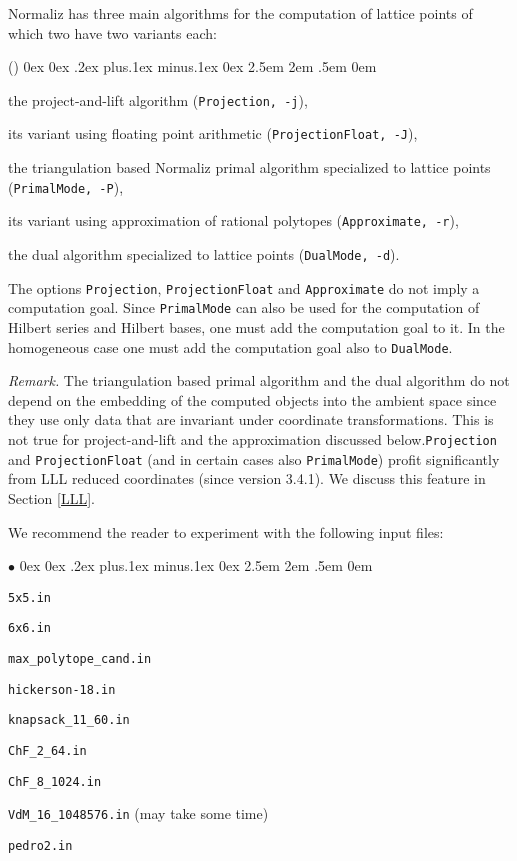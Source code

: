 \documentclass[12pt,a4paper]{scrartcl}
\newcounter{listi}
\newcommand{\stdli}{ \topsep0ex \partopsep0ex %
\parsep.2ex plus.1ex minus.1ex \itemsep0ex%
\leftmargin2.5em \labelwidth2em \labelsep.5em \rightmargin0em}%
\newenvironment{arab}{\begin{list}{\textup{(\arabic{listi})}}%
	{\usecounter{listi}\stdli}}{\end{list}}
\renewenvironment{itemize}{\begin{list}{{$\bullet$}}{\stdli}}{\end{list}}
\theoremstyle{definition}
\begin{document}
Normaliz has three main algorithms for the computation of lattice points of which two have two variants each:
\begin{arab}
\item the project-and-lift algorithm (\verb|Projection, -j|),
\item its variant using floating point arithmetic (\verb|ProjectionFloat, -J|),
\item the triangulation based Normaliz primal algorithm specialized to lattice points\\ (\verb|PrimalMode, -P|),
\item its variant using approximation of rational polytopes (\verb|Approximate, -r|),
\item the dual algorithm  specialized to lattice points (\verb|DualMode, -d|).
\end{arab}

The options \verb|Projection|, \verb|ProjectionFloat| and \verb|Approximate| do not imply a computation goal. Since \verb|PrimalMode| can also be used for the computation of Hilbert series and Hilbert bases, one must add the computation goal to it. In the homogeneous case one must add the computation goal also to \verb|DualMode|.

\emph{Remark.}\enspace
The triangulation based primal algorithm and the dual algorithm do not depend on the embedding of the computed objects into the ambient space since they use only data that are invariant under coordinate transformations. This is not true for project-and-lift and the approximation discussed below.\verb|Projection| and \verb|ProjectionFloat| (and in certain cases also  \verb|PrimalMode|) profit significantly from LLL reduced coordinates (since version 3.4.1). We discuss this feature in Section \ref{LLL}. 

We recommend the reader to experiment with the following input files:
\begin{itemize}
	\item \verb|5x5.in|
	\item \verb|6x6.in|
	\item \verb|max_polytope_cand.in|
	\item \verb|hickerson-18.in|
	\item \verb|knapsack_11_60.in|
	\item \verb|ChF_2_64.in|
	\item \verb|ChF_8_1024.in|
	\item \verb|VdM_16_1048576.in| (may take some time)
	\item \verb|pedro2.in|
\end{itemize}
\end{document}
